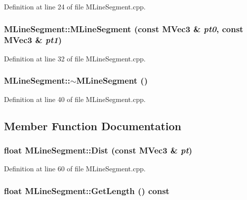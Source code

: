 Definition at line 24 of file MLineSegment.cpp.\hypertarget{class_m_line_segment_0c74581a94c2432cd5e0f3cbb6d82db1}{
\subsubsection[{MLineSegment}]{\setlength{\rightskip}{0pt plus 5cm}MLineSegment::MLineSegment (const {\bf MVec3} \& {\em pt0}, \/  const {\bf MVec3} \& {\em pt1})}}
\label{class_m_line_segment_0c74581a94c2432cd5e0f3cbb6d82db1}




Definition at line 32 of file MLineSegment.cpp.\hypertarget{class_m_line_segment_32648c0bc4d668c8949519b55472336a}{
\subsubsection[{$\sim$MLineSegment}]{\setlength{\rightskip}{0pt plus 5cm}MLineSegment::$\sim$MLineSegment ()}}
\label{class_m_line_segment_32648c0bc4d668c8949519b55472336a}




Definition at line 40 of file MLineSegment.cpp.

\subsection{Member Function Documentation}
\hypertarget{class_m_line_segment_cd96fcdb670fc3ce07abf93372130631}{
\subsubsection[{Dist}]{\setlength{\rightskip}{0pt plus 5cm}float MLineSegment::Dist (const {\bf MVec3} \& {\em pt})}}
\label{class_m_line_segment_cd96fcdb670fc3ce07abf93372130631}




Definition at line 60 of file MLineSegment.cpp.\hypertarget{class_m_line_segment_867d62804ae811b05cac8068c8e8130b}{
\subsubsection[{GetLength}]{\setlength{\rightskip}{0pt plus 5cm}float MLineSegment::GetLength () const}}
\label{class_m_line_segment_867d62804ae811b05cac8068c8e8130b}




